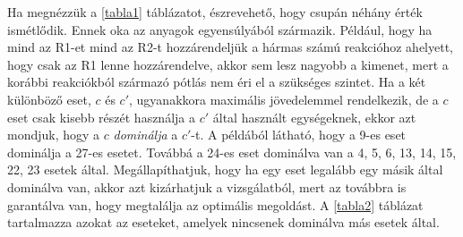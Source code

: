 Ha megnézzük a \ref{tabla1} táblázatot, észrevehető, hogy csupán néhány érték ismétlődik.
Ennek oka az anyagok egyensúlyából származik.
Például, hogy ha mind az R1-et mind az R2-t hozzárendeljük a hármas számú reakcióhoz ahelyett, hogy csak az R1 lenne hozzárendelve, akkor sem lesz nagyobb a kimenet, mert a korábbi reakciókból származó pótlás nem éri el a szükséges szintet.
Ha a két különböző eset, $c$ és $c'$, ugyanakkora maximális jövedelemmel rendelkezik, de a $c$ eset csak kisebb részét használja a $c'$ által használt egységeknek, ekkor azt mondjuk, hogy a $c$ \textit{dominálja} a $c'$-t.
A példából látható, hogy a 9-es eset dominálja a 27-es esetet.
Továbbá a 24-es eset dominálva van a 4, 5, 6, 13, 14, 15, 22, 23 esetek által.
Megállapíthatjuk, hogy ha egy eset legalább egy másik által dominálva van, akkor azt kizárhatjuk a vizsgálatból, mert az továbbra is garantálva van, hogy megtalálja az optimális megoldást.
A \ref{tabla2} táblázat tartalmazza azokat az eseteket, amelyek nincsenek dominálva más esetek által. 

